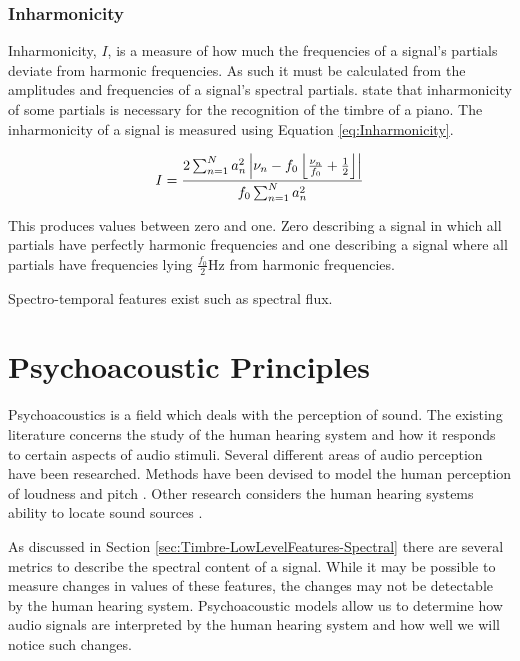 		\subsubsection*{Inharmonicity}
			Inharmonicity, $I$, is a measure of how much the frequencies of a signal's partials deviate from
			harmonic frequencies. As such it must be calculated from the amplitudes and frequencies of a
			signal's spectral partials. \citet{fletcher1962quality} state that inharmonicity of some partials
			is necessary for the recognition of the timbre of a piano. The inharmonicity of a signal is
			measured using Equation \ref{eq:Inharmonicity}.
			
			\begin{equation}
				I = \frac{2\sum_{n = 1}^{N}a_{n}^{2}
					   \left|\nu_{n} - f_{0}\left\lfloor\frac{\nu_{n}}{f_{0}} + \frac{1}{2}\right\rfloor\right|}
					   {f_{0}\sum_{n = 1}^{N} a_{n}^{2}}
				\label{eq:Inharmonicity}
			\end{equation}

			This produces values between zero and one. Zero describing a signal in which all partials have
			perfectly harmonic frequencies and one describing a signal where all partials have frequencies
			lying $\frac{f_{0}}{2}$Hz from harmonic frequencies.

		\note
		{
			Spectro-temporal features exist such as spectral flux.
		}

\section{Psychoacoustic Principles}
\label{sec:Timbre-PsychoacousticPrinciples}
	Psychoacoustics is a field which deals with the perception of sound. The existing literature concerns the study of
	the human hearing system and how it responds to certain aspects of audio stimuli. Several different areas of audio
	perception have been researched. Methods have been devised to model the human perception of loudness
	\citep{moore1997a} and pitch \citep{gerhard2003pitch}. Other research considers the human hearing systems ability
	to locate sound sources \citep{blauert1997spatial}. 

	As discussed in Section \ref{sec:Timbre-LowLevelFeatures-Spectral} there are several metrics to describe the
	spectral content of a signal. While it may be possible to measure changes in values of these features, the changes
	may not be detectable by the human hearing system. Psychoacoustic models allow us to determine how audio signals
	are interpreted by the human hearing system and how well we will notice such changes.

